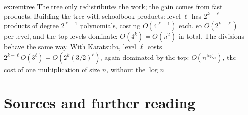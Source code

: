 \begin{solution}{ex:remtree}
\idea The tree only redistributes the work; the gain comes from fast products.
\writeup Building the tree with schoolbook products: level $\ell$ has $2^{k-\ell}$ products of degree $2^{\ell-1}$ polynomials, costing $O(4^{\ell-1})$ each, so $O(2^{k+\ell})$ per level, and the top levels dominate: $O(4^k)=O(n^2)$ in total. The divisions behave the same way. With Karatsuba, level $\ell$ costs $2^{k-\ell}O(3^\ell)=O(2^k(3/2)^\ell)$, again dominated by the top: $O(n^{\log_23})$, the cost of one multiplication of size $n$, without the $\log n$.
\end{solution}

\section*{Sources and further reading}

